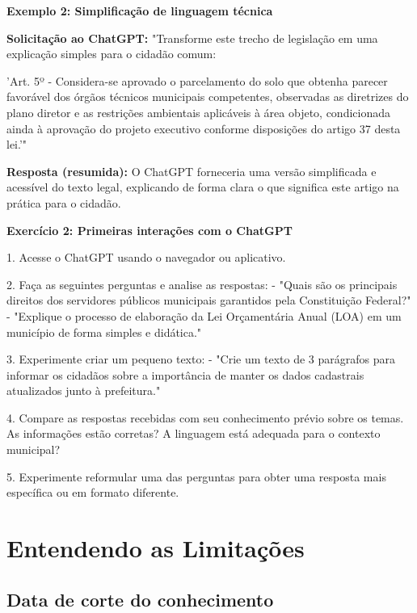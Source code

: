 \documentclass[12pt,a4paper]{book}
\begin{document}
\begin{tcolorbox}[exemplo]
\textbf{Exemplo 2: Simplificação de linguagem técnica}

\textbf{Solicitação ao ChatGPT:}
"Transforme este trecho de legislação em uma explicação simples para o cidadão comum:

'Art. 5º - Considera-se aprovado o parcelamento do solo que obtenha parecer favorável dos órgãos técnicos municipais competentes, observadas as diretrizes do plano diretor e as restrições ambientais aplicáveis à área objeto, condicionada ainda à aprovação do projeto executivo conforme disposições do artigo 37 desta lei.'"

\textbf{Resposta (resumida):}
O ChatGPT forneceria uma versão simplificada e acessível do texto legal, explicando de forma clara o que significa este artigo na prática para o cidadão.
\end{tcolorbox}

\begin{tcolorbox}[pratica]
\textbf{Exercício 2: Primeiras interações com o ChatGPT}

1. Acesse o ChatGPT usando o navegador ou aplicativo.

2. Faça as seguintes perguntas e analise as respostas:
   - "Quais são os principais direitos dos servidores públicos municipais garantidos pela Constituição Federal?"
   - "Explique o processo de elaboração da Lei Orçamentária Anual (LOA) em um município de forma simples e didática."

3. Experimente criar um pequeno texto:
   - "Crie um texto de 3 parágrafos para informar os cidadãos sobre a importância de manter os dados cadastrais atualizados junto à prefeitura."

4. Compare as respostas recebidas com seu conhecimento prévio sobre os temas. As informações estão corretas? A linguagem está adequada para o contexto municipal?

5. Experimente reformular uma das perguntas para obter uma resposta mais específica ou em formato diferente.
\end{tcolorbox}

\section{Entendendo as Limitações}

\subsection{Data de corte do conhecimento}
\end{document}
